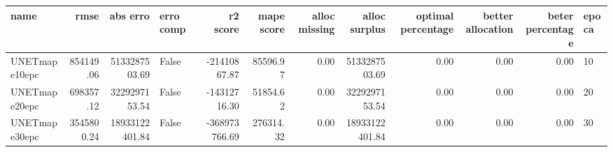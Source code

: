 \begin{tabular}{lrrlrrrrrrrl}
\toprule
name & rmse & abs erro & erro comp & r2 score & mape score & alloc missing & alloc surplus & optimal percentage & better allocation & beter percentage & epoca \\
\midrule
UNETmape10epc & 854149.06 & 5133287503.69 & False & -21410867.87 & 85596.97 & 0.00 & 5133287503.69 & 0.00 & 0.00 & 0.00 & 10 \\
UNETmape20epc & 698357.12 & 3229297153.54 & False & -14312716.30 & 51854.62 & 0.00 & 3229297153.54 & 0.00 & 0.00 & 0.00 & 20 \\
UNETmape30epc & 3545800.24 & 18933122401.84 & False & -368973766.69 & 276314.32 & 0.00 & 18933122401.84 & 0.00 & 0.00 & 0.00 & 30 \\
\bottomrule
\end{tabular}
